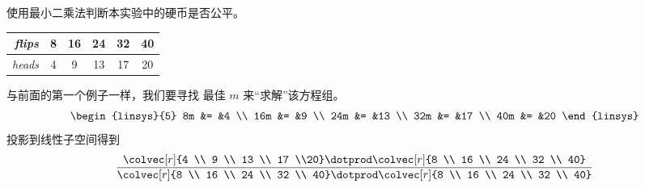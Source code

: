 \begin{exercises}
  \item
    使用最小二乘法判断本实验中的硬币是否公平。
    \begin{center}
      \begin{tabular}{r|ccccc}
         \textit{flips}  &8  &16  &24  &32  &40 \\
         \hline
         \textit{heads}  &4  &9   &13  &17  &20
      \end{tabular}
    \end{center}
    \begin{answer}
      与前面的第一个例子一样，我们要寻找
      最佳 $m$ 来“求解”该方程组。 
      \begin{equation*}
        \begin{linsys}{5}
          8m  &=  &4  \\
          16m &=  &9  \\
          24m &=  &13 \\
          32m &=  &17 \\
          40m &=  &20
        \end{linsys}
      \end{equation*}
      投影到线性子空间得到
      \begin{equation*}
        \frac{\colvec[r]{4 \\ 9 \\ 13 \\ 17 \\20}
          \dotprod
          \colvec[r]{8  \\ 16 \\ 24 \\ 32 \\ 40}}{%
          \colvec[r]{8  \\ 16 \\ 24 \\ 32 \\ 40}
          \dotprod
          \colvec[r]{8  \\ 16 \\ 24 \\ 32 \\ 40}}

\end{equation*}
\end{answer}
\end{exercises}

